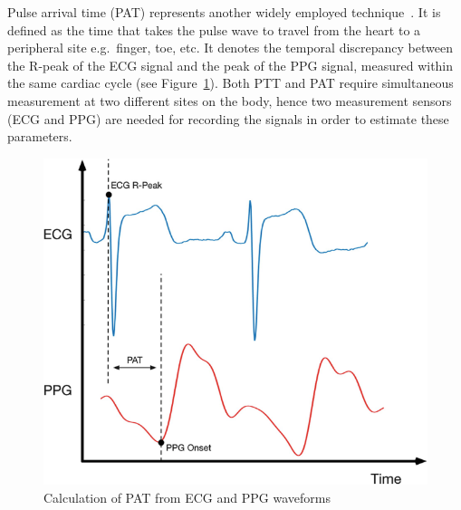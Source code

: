 Pulse arrival time (PAT) represents another widely employed technique~\cite{sharmaCuffLessContinuousBlood2017}.
It is defined as the time that takes the pulse wave to travel from the heart to a peripheral site e.g.\ finger, toe, etc.
It denotes the temporal discrepancy between the R-peak of the ECG signal and the peak of the PPG signal, measured within the same cardiac cycle (see Figure~\ref{fig:pat}).
Both PTT and PAT require simultaneous measurement at two different sites on the body, hence two measurement sensors (ECG and PPG) are needed for recording the signals in order to estimate these parameters.
\begin{figure}[h]
    \centering
    \includegraphics[scale=0.4]{images/sp/pat}
    \caption{Calculation of PAT from ECG and PPG waveforms~\cite{dhillonPulseArrivalTime2019}}
    \label{fig:pat}
\end{figure}

